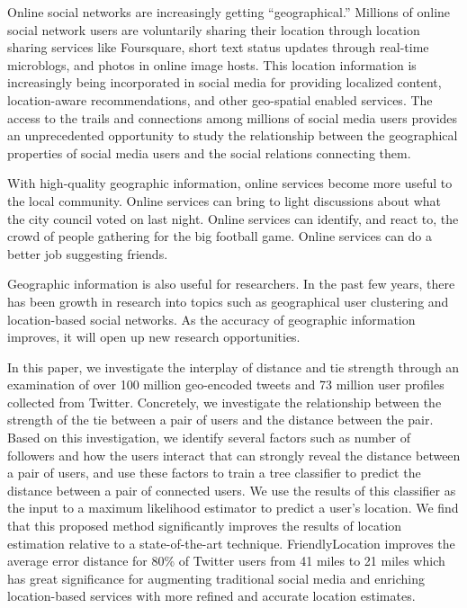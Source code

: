 \ifdefined\THESIS
    \pagestyle{plain} %
    \setcounter{page}{1}
\else
\fi



Online social networks are increasingly getting ``geographical.''
%
Millions of online social network users are voluntarily sharing their location
through location sharing services like Foursquare, short text status updates
through real-time microblogs, and photos in online image hosts.
%
This location information is increasingly being incorporated in social media
for providing localized content, location-aware recommendations, and other
geo-spatial enabled services.
%
The access to the trails and connections among millions of social media users
provides an unprecedented opportunity to study the relationship between the
geographical properties of social media users and the social relations
connecting them.

With high-quality geographic information, online services become more useful to
the local community.
%
Online services can bring to light discussions about what the city council
voted on last night.
%
Online services can identify, and react to, the crowd of people gathering for
the big football game.
%
Online services can do a better job suggesting friends.
%

Geographic information is also useful for researchers.
%
In the past few years, there has been growth in research into topics such as
geographical user clustering and location-based social networks.
%
As the accuracy of geographic information improves, it will open up new
research opportunities.

In this paper, we investigate the interplay of distance and tie strength
through an examination of over 100 million geo-encoded tweets and 73 million
user profiles collected from Twitter.
%
Concretely, we investigate the relationship between the strength of the tie
between a pair of users and the distance between the pair.
%
Based on this investigation, we identify several factors such as number of
followers and how the users interact that can strongly reveal the distance
between a pair of users, and use these factors to train a tree classifier to
predict the distance between a pair of connected users.
%
We use the results of this classifier as the input to a maximum likelihood
estimator to predict a user's location.
%
We find that this proposed method significantly improves the results of
location estimation relative to a state-of-the-art technique.
%
FriendlyLocation improves the average error distance for 80\% of Twitter users
from 41 miles to 21 miles which has great significance for augmenting
traditional social media and enriching location-based services with more
refined and accurate location estimates.

